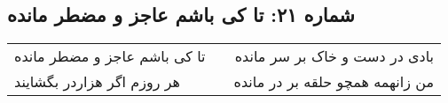 \begin{center}
\section*{شماره ۲۱: تا کی باشم عاجز و مضطر مانده}
\label{sec:021}
\begin{longtable}{l p{0.5cm} r}
تا کی باشم عاجز و مضطر مانده
&&
بادی در دست و خاک بر سر مانده
\\
هر روزم اگر هزاردر بگشایند
&&
من زانهمه همچو حلقه بر در مانده
\\
\end{longtable}
\end{center}
